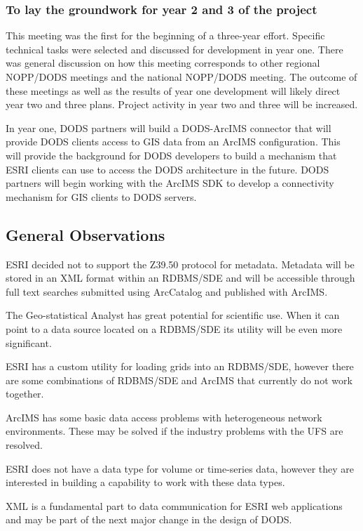 \subsubsection{To lay the groundwork for year 2 and 3 of the project}

This meeting was the first for the beginning of a three-year effort. Specific technical tasks were 
selected and discussed for development in year one. There was general discussion on how this 
meeting corresponds to other regional NOPP/DODS meetings and the national NOPP/DODS 
meeting. The outcome of these meetings as well as the results of year one development will 
likely direct year two and three plans. Project activity in year two and three will be increased.

In year one, DODS partners will build a DODS-ArcIMS connector that will provide DODS 
clients access to GIS data from an ArcIMS configuration. This will provide the background for 
DODS developers to build a mechanism that ESRI clients can use to access the DODS 
architecture in the future. DODS partners will begin working with the ArcIMS SDK to develop a 
connectivity mechanism for GIS clients to DODS servers.


\subsection{General Observations}

ESRI decided not to support the Z39.50 protocol for metadata. Metadata will be stored in an 
XML format within an RDBMS/SDE and will be accessible through full text searches submitted 
using ArcCatalog and published with ArcIMS.

The Geo-statistical Analyst has great potential for scientific use. When it can point to a data 
source located on a RDBMS/SDE its utility will be even more significant.


ESRI has a custom utility for loading grids into an RDBMS/SDE, however there are some 
combinations of RDBMS/SDE and ArcIMS that currently do not work together.

ArcIMS has some basic data access problems with heterogeneous network environments. These 
may be solved if the industry problems with the UFS are resolved. 

ESRI does not have a data type for volume or time-series data, however they are interested in 
building a capability to work with these data types.

XML is a fundamental part to data communication for ESRI web applications and may be part of 
the next major change in the design of DODS.

